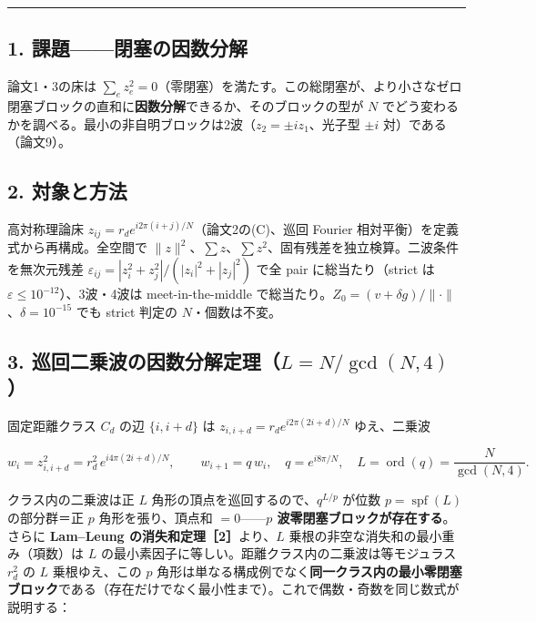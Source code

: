 \documentclass[
  a4paper,
]{ltjsarticle}
\begin{document}
\begin{center}\rule{0.5\linewidth}{0.5pt}\end{center}

\subsection{1.
課題------閉塞の因数分解}\label{ux8ab2ux984cux9589ux585eux306eux56e0ux6570ux5206ux89e3}

論文1・3の床は
\(\sum_e z_e^2=0\)（零閉塞）を満たす。この総閉塞が、より小さなゼロ閉塞ブロックの直和に\textbf{因数分解}できるか、そのブロックの型が
\(N\)
でどう変わるかを調べる。最小の非自明ブロックは2波（\(z_2=\pm i z_1\)、光子型
\(\pm i\) 対）である（論文9）。

\subsection{2. 対象と方法}\label{ux5bfeux8c61ux3068ux65b9ux6cd5}

高対称理論床 \(z_{ij}=r_d e^{i2\pi(i+j)/N}\)（論文2の(C)、巡回 Fourier
相対平衡）を定義式から再構成。全空間で
\(\|z\|^2\)、\(\sum z\)、\(\sum z^2\)、固有残差を独立検算。二波条件を無次元残差
\(\varepsilon_{ij}=|z_i^2+z_j^2|/(|z_i|^2+|z_j|^2)\) で全 pair
に総当たり（strict は \(\varepsilon\le10^{-12}\)）、3波・4波は
meet-in-the-middle
で総当たり。\(Z_0=(v+\delta g)/\|\cdot\|\)、\(\delta=10^{-15}\) でも
strict 判定の \(N\)・個数は不変。

\subsection{\texorpdfstring{3.
巡回二乗波の因数分解定理（\(L=N/\gcd(N,4)\)）}{3. 巡回二乗波の因数分解定理（L=N/\textbackslash gcd(N,4)）}}\label{ux5de1ux56deux4e8cux4e57ux6ce2ux306eux56e0ux6570ux5206ux89e3ux5b9aux7406lngcdn4}

固定距離クラス \(C_d\) の辺 \(\{i,i+d\}\) は
\(z_{i,i+d}=r_d e^{i2\pi(2i+d)/N}\) ゆえ、二乗波

\[w_i=z_{i,i+d}^2=r_d^2\,e^{i4\pi(2i+d)/N},\qquad w_{i+1}=q\,w_i,\quad q=e^{i8\pi/N},\quad L=\operatorname{ord}(q)=\frac{N}{\gcd(N,4)}.\]

クラス内の二乗波は正 \(L\) 角形の頂点を巡回するので、\(q^{L/p}\) が位数
\(p=\operatorname{spf}(L)\) の部分群＝正 \(p\) 角形を張り、頂点和
\(=0\)------\textbf{\(p\) 波零閉塞ブロックが存在する}。さらに
\textbf{Lam--Leung の消失和定理［2］}より、\(L\)
乗根の非空な消失和の最小重み（項数）は \(L\)
の最小素因子に等しい。距離クラス内の二乗波は等モジュラス \(r_d^2\) の
\(L\) 乗根ゆえ、この \(p\)
角形は単なる構成例でなく\textbf{同一クラス内の最小零閉塞ブロック}である（存在だけでなく最小性まで）。これで偶数・奇数を同じ数式が説明する：
\end{document}
